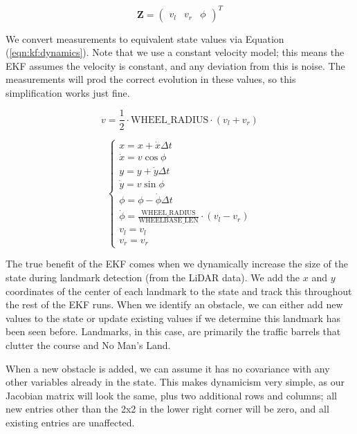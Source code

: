 \begin{equation}
    \boldsymbol{Z} = \begin{pmatrix}
    v_l & v_r & \phi
    \end{pmatrix} ^T
    \label{eqn:kf:Z}
\end{equation}

We convert measurements to equivalent state values via Equation (\ref{eqn:kf:dynamics}). Note that we use a constant velocity model; this means the EKF assumes the velocity is constant, and any deviation from this is noise. The measurements will prod the correct evolution in these values, so this simplification works just fine.

\begin{equation}
    v = \frac{1}{2} \cdot \textrm{WHEEL\_RADIUS} \cdot (v_l + v_r)
    \label{eqn:kf:dynamics}
\end{equation}

\begin{equation*}
    \begin{cases}
    x = x + \dot{x} \Delta t\\
    \dot{x} = v \cos{\phi}\\
    y = y + \dot{y} \Delta t\\
    \dot{y} = v \sin{\phi}\\
    \phi = \phi - \dot{\phi} \Delta t\\
    \dot{\phi} = \frac{\textrm{WHEEL\_RADIUS}}{\textrm{WHEELBASE\_LEN}} \cdot (v_l - v_r)\\
    v_l = v_l\\
    v_r = v_r
    \end{cases}
\end{equation*}

The true benefit of the EKF comes when we dynamically increase the size of the state during landmark detection (from the LiDAR data). We add the $x$ and $y$ coordinates of the center of each landmark to the state and track this throughout the rest of the EKF runs. When we identify an obstacle, we can either add new values to the state or update existing values if we determine this landmark has been seen before. Landmarks, in this case, are primarily the traffic barrels that clutter the course and No Man's Land. 

When a new obstacle is added, we can assume it has no covariance with any other variables already in the state. This makes dynamicism very simple, as our Jacobian matrix will look the same, plus two additional rows and columns; all new entries other than the 2x2 in the lower right corner will be zero, and all existing entries are unaffected. 

